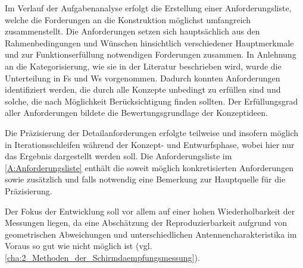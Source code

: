 


Im Verlauf der Aufgabenanalyse erfolgt die Erstellung einer Anforderungsliste, welche die Forderungen an die Konstruktion möglichst umfangreich zusammenstellt. Die Anforderungen setzen sich hauptsächlich aus den Rahmenbedingungen und Wünschen hinsichtlich verschiedener Hauptmerkmale und zur Funktionserfüllung notwendigen Forderungen zusammen. In Anlehnung an die Kategorisierung, wie sie in der Literatur beschrieben wird, wurde die Unterteilung in \acp{F} und \acp{W} vorgenommen. Dadurch konnten Anforderungen identifiziert werden, die durch alle Konzepte unbedingt zu erfüllen sind und solche, die nach Möglichkeit Berücksichtigung finden sollten. Der Erfüllungsgrad aller Anforderungen bildete die Bewertungsgrundlage der Konzeptideen.
\par
\vspace{\linespace}
Die Präzisierung der Detailanforderungen erfolgte teilweise und insofern möglich in Iterationsschleifen während der Konzept- und Entwurfsphase, wobei hier nur das Ergebnis dargestellt werden soll. Die Anforderungsliste im \Anhang\ref{A:Anforderungsliste} enthält die  soweit möglich konkretisierten Anforderungen sowie zusätzlich und falls notwendig eine Bemerkung zur Hauptquelle für die Präzisierung.
\par
\vspace{\linespace}
Der Fokus der Entwicklung soll vor allem auf einer hohen Wiederholbarkeit der Messungen liegen, da eine Abschätzung der Reproduzierbarkeit aufgrund von geometrischen Abweichungen und unterschiedlichen Antennencharakteristika im Voraus so gut wie nicht möglich ist (vgl. \Abschnitt\ref{cha:2_Methoden_der_Schirmdaempfungsmessung}).





